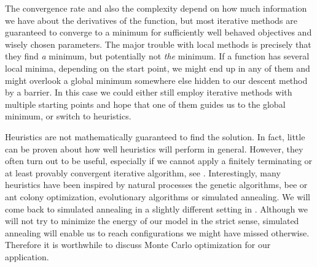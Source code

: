 The convergence rate and also the complexity depend on how much information we
have about the derivatives of the function, but most iterative methods are
guaranteed to converge to a minimum for sufficiently well behaved objectives and
wisely chosen parameters. The major trouble with local methods is precisely that
they find \emph{a} minimum, but potentially not \emph{the} minimum. If a
function has several local minima, depending on the start point, we might end up
in any of them and might overlook a global minimum somewhere else hidden to our
descent method by a barrier. In this case we could either still employ iterative
methods with multiple starting points and hope that one of them guides us to the
global minimum, or switch to heuristics.

Heuristics are not mathematically guaranteed to find the solution. In fact,
little can be proven about how well heuristics will perform in general. However,
they often turn out to be useful, especially if we cannot apply a finitely
terminating or at least provably convergent iterative algorithm, see
. Interestingly, many heuristics have been inspired by
natural processes the genetic algorithms, bee or ant colony optimization,
evolutionary algorithms or simulated annealing. We will come back to simulated
annealing in a slightly different setting in . Although we
will not try to minimize the energy of our model in the strict sense, simulated
annealing will enable us to reach configurations we might have missed otherwise.
Therefore it is worthwhile to discuss Monte Carlo optimization for our
application.

